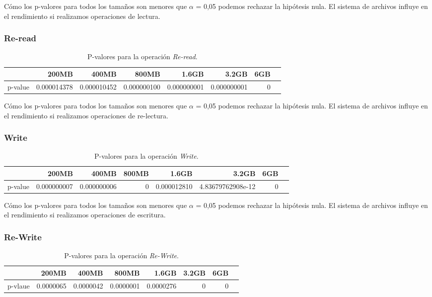 Cómo los p-valores para todos los tamaños son menores que $\alpha$ = 0,05 podemos rechazar la hipótesis nula. El sistema de archivos influye en el rendimiento si realizamos operaciones de lectura. 

\subsubsection{Re-read}
\begin{table}[!htp]\centering
\scriptsize
\begin{tabular}{lrrrrrrr}\toprule
&200MB &400MB &800MB &1.6GB &3.2GB &6GB \\\midrule
p-value &0.000014378 &0.000010452 &0.000000100 &0.000000001 &0.000000001 &0 \\
\bottomrule
\end{tabular}
\caption{P-valores para la operación \textit{Re-read}.}\label{tab: }
\end{table}

Cómo los p-valores para todos los tamaños son menores que $\alpha$ = 0,05 podemos rechazar la hipótesis nula. El sistema de archivos influye en el rendimiento si realizamos operaciones de re-lectura. 


\subsubsection{Write}
\begin{table}[!htp]\centering
\scriptsize
\begin{tabular}{lrrrrrrr}\toprule
&200MB &400MB &800MB &1.6GB &3.2GB &6GB \\\midrule
p-value &0.000000007 &0.000000006 &0 &0.000012810 &4.83679762908e-12 &0\\
\bottomrule
\end{tabular}
\caption{P-valores para la operación \textit{Write}.}\label{tab: }
\end{table}

Cómo los p-valores para todos los tamaños son menores que $\alpha$ = 0,05 podemos rechazar la hipótesis nula. El sistema de archivos influye en el rendimiento si realizamos operaciones de escritura. 
\newpage
\subsubsection{Re-Write}
\begin{table}[!htp]\centering
\scriptsize
\begin{tabular}{lrrrrrrr}\toprule
&200MB &400MB &800MB &1.6GB &3.2GB &6GB \\\midrule
p-vlaue &0.0000065 &0.0000042 &0.0000001 &0.0000276 &0 &0 \\
\bottomrule
\end{tabular}
\caption{P-valores para la operación \textit{Re-Write}.}\label{tab: }
\end{table}

